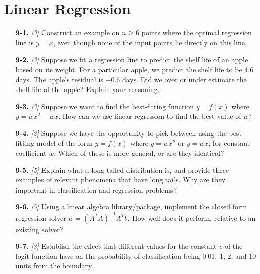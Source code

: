 \documentclass[10pt]{article}
\begin{document}
\section*{Linear Regression}
\begin{enumerate}
    \item [{\bf 9-1.}] \emph{[3]} Construct an example on $n \geq 6$ points where the optimal regression line is $y = x$, even though none of the input points lie directly on this line.
    \item [{\bf 9-2.}] \emph{[3]} Suppose we fit a regression line to predict the shelf life of an apple based on its weight. For a particular apple, we predict the shelf life to be 4.6 days. The apple's residual is $-0.6$ days. Did we over or under estimate the shelf-life of the apple? Explain your reasoning.
    \item [{\bf 9-3.}] \emph{[3]} Suppose we want to find the best-fitting function $y = f(x)$ where $y = wx^2 + wx$. How can we use linear regression to find the best value of $w$?
    \item [{\bf 9-4.}] \emph{[3]} Suppose we have the opportunity to pick between using the best fitting model of the form $y = f(x)$ where $y = wx^2$ or $y = wx$, for constant coefficient $w$. Which of these is more general, or are they identical?
    \item [{\bf 9-5.}] \emph{[5]} Explain what a long-tailed distribution is, and provide three examples of relevant phenomena that have long tails. Why are they important in classification and regression problems?
    \item [{\bf 9-6.}] \emph{[5]} Using a linear algebra library/package, implement the closed form regression solver $w = (A^T A)^{-1} A^T b$. How well does it perform, relative to an existing solver?
    \item [{\bf 9-7.}] \emph{[3]} Establish the effect that different values for the constant $c$ of the logit function have on the probability of classification being 0.01, 1, 2, and 10 units from the boundary.
\end{enumerate}
\end{document}
